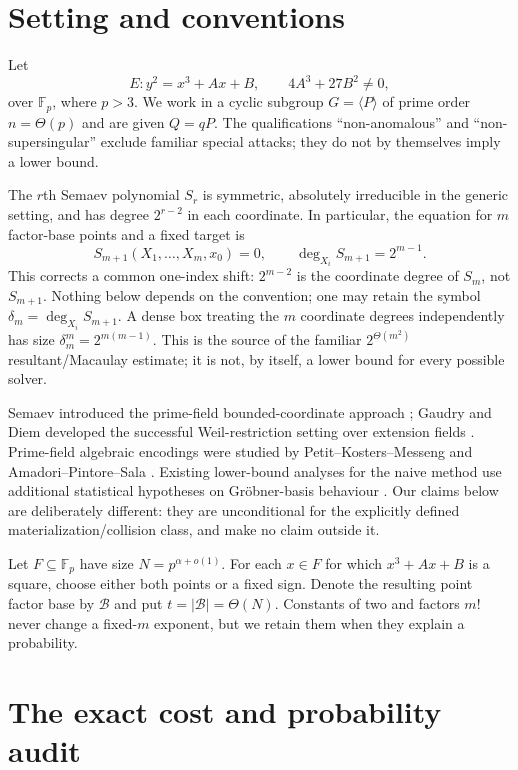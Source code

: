 \documentclass[11pt]{article}
\newcommand{\F}{\mathbb F}
\newcommand{\cB}{\mathcal B}
\begin{document}
\section{Setting and conventions}

Let
\[
 E: y^2=x^3+Ax+B,\qquad 4A^3+27B^2\ne0,
\]
over $\F_p$, where $p>3$.  We work in a cyclic subgroup $G=\langle P\rangle$
of prime order $n=\Theta(p)$ and are given $Q=qP$.  The qualifications
``non-anomalous'' and ``non-supersingular'' exclude familiar special attacks;
they do not by themselves imply a lower bound.

The $r$th Semaev polynomial $S_r$ is symmetric, absolutely irreducible in the
generic setting, and has degree $2^{r-2}$ in each coordinate.  In particular,
the equation for $m$ factor-base points and a fixed target is
\[
 S_{m+1}(X_1,\ldots,X_m,x_0)=0,
 \qquad \deg_{X_i}S_{m+1}=2^{m-1}.                 \tag{1}
\]
This corrects a common one-index shift: $2^{m-2}$ is the coordinate degree of
$S_m$, not $S_{m+1}$.  Nothing below depends on the convention; one may retain
the symbol $\delta_m=\deg_{X_i}S_{m+1}$.  A dense box treating the $m$
coordinate degrees independently has size
$\delta_m^m=2^{m(m-1)}$.  This is the source of the familiar
$2^{\Theta(m^2)}$ resultant/Macaulay estimate; it is not, by itself, a lower
bound for every possible solver.

Semaev introduced the prime-field bounded-coordinate approach
\cite{Semaev2004}; Gaudry and Diem developed the successful Weil-restriction
setting over extension fields \cite{Gaudry2009,Diem2011}.  Prime-field
algebraic encodings were studied by Petit--Kosters--Messeng
\cite{PetitKostersMesseng2016} and Amadori--Pintore--Sala
\cite{AmadoriPintoreSala2018}.  Existing lower-bound analyses for the naive
method use additional statistical hypotheses on Gr\"obner-basis behaviour
\cite{YokoyamaEtAl2020}.  Our claims below are deliberately different: they
are unconditional for the explicitly defined materialization/collision class,
and make no claim outside it.

Let $F\subseteq\F_p$ have size $N=p^{\alpha+o(1)}$.  For each $x\in F$ for
which $x^3+Ax+B$ is a square, choose either both points or a fixed sign.  Denote
the resulting point factor base by $\cB$ and put $t=|\cB|=\Theta(N)$.  Constants
of two and factors $m!$ never change a fixed-$m$ exponent, but we retain them
when they explain a probability.

\section{The exact cost and probability audit}
\end{document}
